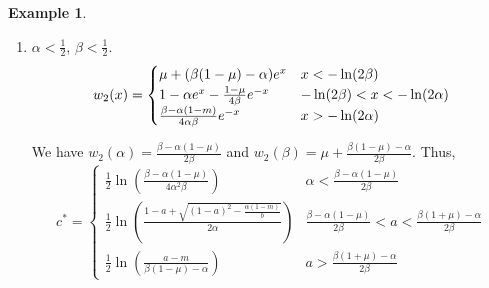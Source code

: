 \documentclass[11pt]{article}
\theoremstyle{definition}
\newtheorem{ex}[thm]{Example}
\numberwithin{equation}{section}
\numberwithin{thm}{section}
\renewcommand{\a}{\alpha}
\renewcommand{\b}{\beta}
\newcommand{\m}{\mu}
\begin{document}
\begin{ex}
%
%
%
%
%
%
%
%
%
%
%

\begin{enumerate}[{Case} 1.]

\item $\a<\frac{1}{2}$, $\b<\frac{1}{2}$.
\begin{equation}
w_2(x) = \begin{cases}
\m + (\Conecaseone) e^x  & x < -\ln(2\b) \\
1 - \Ctwocaseone e^x - \Cthreecaseone e^{-x} & -\ln(2\b) < x < -\ln(2\a) \\
\Cfourcaseone e^{-x} & x > -\ln(2\a)
\end{cases}
\end{equation}

We have $w_2(\alpha)=\frac{\b-\a(1-\m)}{2\b}$ and $w_2(\beta)=\m + \frac{\b(1-\m)-\a}{2\b}$. Thus,
\begin{equation}
c^* = \begin{cases}
\frac{1}{2} \ln \left( \frac{\b-\a(1-\m)}{4\a^2\b} \right) & \a < \frac{\b-\a(1-\m)}{2\b} \\
\frac{1}{2} \ln \left( \frac{1-a + \sqrt{(1-a)^2 - \frac{\a(1-m)}{b}}}{2\a} \right) & \frac{\b-\a(1-\m)}{2\b} < a < \frac{\b(1+\m)-\a}{2\b} \\
\frac{1}{2} \ln \left( \frac{a-m}{\b(1-\m)-\a}\right) & a > \frac{\b(1+\m)-\a}{2\b}
\end{cases}
\end{equation}



\end{enumerate}
\end{ex}
\end{document}
